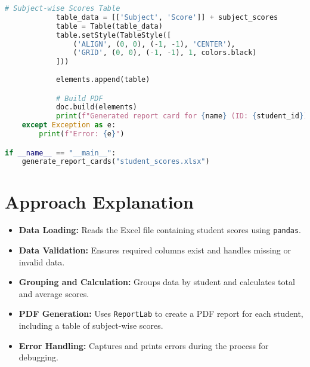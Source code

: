 \documentclass{article}
\begin{document}
\begin{lstlisting}[language=Python, caption=Python Script for Generating Report Cards]
            # Subject-wise Scores Table
            table_data = [['Subject', 'Score']] + subject_scores
            table = Table(table_data)
            table.setStyle(TableStyle([
                ('ALIGN', (0, 0), (-1, -1), 'CENTER'),
                ('GRID', (0, 0), (-1, -1), 1, colors.black)
            ]))
            
            elements.append(table)

            # Build PDF
            doc.build(elements)
            print(f"Generated report card for {name} (ID: {student_id})")
    except Exception as e:
        print(f"Error: {e}")

if __name__ == "__main__":
    generate_report_cards("student_scores.xlsx")
\end{lstlisting}

\section*{Approach Explanation}

\begin{itemize}
    \item \textbf{Data Loading:} Reads the Excel file containing student scores using \texttt{pandas}.
    \item \textbf{Data Validation:} Ensures required columns exist and handles missing or invalid data.
    \item \textbf{Grouping and Calculation:} Groups data by student and calculates total and average scores.
    \item \textbf{PDF Generation:} Uses \texttt{ReportLab} to create a PDF report for each student, including a table of subject-wise scores.
    \item \textbf{Error Handling:} Captures and prints errors during the process for debugging.
\end{itemize}
\end{document}
